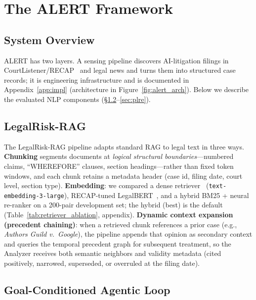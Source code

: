 \section{The ALERT Framework}
\label{sec:framework}
\subsection{System Overview}

ALERT has two layers. A sensing pipeline discovers AI-litigation filings in CourtListener/RECAP~\citep{courtlistener2023} and legal news and turns them into structured case records; it is engineering infrastructure and is documented in Appendix~\ref{app:impl} (architecture in Figure~\ref{fig:alert_arch}). Below we describe the evaluated NLP components (\S\ref{sec:legalrag}--\ref{sec:plre}).

\subsection{LegalRisk-RAG}
\label{sec:legalrag}

The LegalRisk-RAG pipeline adapts standard RAG to legal text in three ways. \textbf{Chunking} segments documents at \emph{logical structural boundaries}---numbered claims, ``WHEREFORE'' clauses, section headings---rather than fixed token windows, and each chunk retains a metadata header (case id, filing date, court level, section type). \textbf{Embedding}: we compared a dense retriever~\citep{karpukhin2020dense} (\texttt{text-embedding-3-large}), RECAP-tuned LegalBERT~\citep{chalkidis2020legalbert}, and a hybrid BM25 + neural re-ranker on a 200-pair development set; the hybrid (best) is the default (Table~\ref{tab:retriever_ablation}, appendix). \textbf{Dynamic context expansion (precedent chaining)}: when a retrieved chunk references a prior case (e.g., \emph{Authors Guild v.\ Google}), the pipeline appends that opinion as secondary context and queries the temporal precedent graph for subsequent treatment, so the Analyzer receives both semantic neighbors and validity metadata (cited positively, narrowed, superseded, or overruled at the filing date).

\subsection{Goal-Conditioned Agentic Loop}
\label{sec:agentic_loop}


